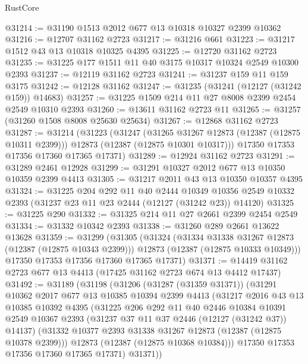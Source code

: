 \begin{lexlean}{RustCore}
\begin{coremodule}
@31214 := @31190 @1513 @2012 @677 @13 @10318 @10327 @2399 @10362
@31216 := @12707 @31162 @2723
@31217 := @31216 @661
@31223 := @31217 @1512 @43 @13 @10318 @10325 @4395
@31225 := @12720 @31162 @2723
@31235 := @31225 @177 @1511 @11 @40 @3175 @10317 @10324 @2549 @10300 @2393
@31237 := @12119 @31162 @2723
@31241 := @31237 @159 @11 @159 @3175
@31242 := @12128 @31162
@31247 := @31235 (@31241 (@12127 (@31242 @159)) @14683)
@31257 := @31225 @1509 @214 @11 @27 @8008 @2399 @2454 @2549 @10310 @2393
@31260 := @13611 @31162 @2723 @11
@31265 := @31257 (@31260 @1508 @8008 @25630 @25634)
@31267 := @12868 @31162 @2723
@31287 := @31214
    (@31223
      (@31247
        (@31265 @31267 @12873 (@12387 (@12875 @10311 @2399)))
        @12873
        (@12387 (@12875 @10301 @10317)))
      @17350
      @17353
      @17356
      @17360
      @17365
      @17371)
@31289 := @12924 @31162 @2723
@31291 := @31289 @2461 @12928
@31299 := @31291 @10327 @2012 @677 @13 @10350 @10359 @2399 @4413
@31305 := @31217 @2011 @43 @13 @10350 @10357 @4395
@31324 := @31225
    @204
    @292
    @11
    @40
    @2444
    @10349
    @10356
    @2549
    @10332
    @2393
    (@31237 @23 @11 @23 @2444 (@12127 (@31242 @23)) @14120)
@31325 := @31225 @290
@31332 := @31325 @214 @11 @27 @2661 @2399 @2454 @2549
@31334 := @31332 @10342 @2393
@31338 := @31260 @289 @2661 @13622 @13628
@31359 := @31299
    (@31305
      (@31324
        (@31334 @31338 @31267 @12873 (@12387 (@12875 @10343 @2399)))
        @12873
        (@12387 (@12875 @10333 @10349)))
      @17350
      @17353
      @17356
      @17360
      @17365
      @17371)
@31371 := @14419 @31162 @2723 @677 @13 @4413 (@17425 @31162 @2723 @674 @13 @4412 @17437)
@31492 := @31189
    (@31198
      (@31206
        (@31287 (@31359 @31371))
        (@31291
          @10362
          @2017
          @677
          @13
          @10385
          @10394
          @2399
          @4413
          (@31217
            @2016
            @43
            @13
            @10385
            @10392
            @4395
            (@31225
              @206
              @292
              @11
              @40
              @2446
              @10384
              @10391
              @2549
              @10367
              @2393
              (@31237 @37 @11 @37 @2446 (@12127 (@31242 @37)) @14137)
              (@31332 @10377 @2393 @31338 @31267 @12873 (@12387 (@12875 @10378 @2399)))
              @12873
              (@12387 (@12875 @10368 @10384)))
            @17350
            @17353
            @17356
            @17360
            @17365
            @17371)
          @31371))

\end{coremodule}
\end{lexlean}
